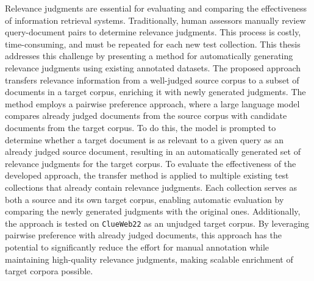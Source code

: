 Relevance judgments are essential for evaluating and comparing the effectiveness of information retrieval systems. Traditionally, human assessors manually review query-document pairs to determine relevance judgments. This process is costly, time-consuming, and must be repeated for each new test collection. This thesis addresses this challenge by presenting a method for automatically generating relevance judgments using existing annotated datasets. The proposed approach transfers relevance information from a well-judged source corpus to a subset of documents in a target corpus, enriching it with newly generated judgments. The method employs a pairwise preference approach, where a large language model compares already judged documents from the source corpus with candidate documents from the target corpus. To do this, the model is prompted to determine whether a target document is as relevant to a given query as an already judged source document, resulting in an automatically generated set of relevance judgments for the target corpus. To evaluate the effectiveness of the developed approach, the transfer method is applied to multiple existing test collections that already contain relevance judgments. Each collection serves as both a source and its own target corpus, enabling automatic evaluation by comparing the newly generated judgments with the original ones. Additionally, the approach is tested on \texttt{ClueWeb22} as an unjudged target corpus. By leveraging pairwise preference with already judged documents, this approach has the potential to significantly reduce the effort for manual annotation while maintaining high-quality relevance judgments, making scalable enrichment of target corpora possible.

